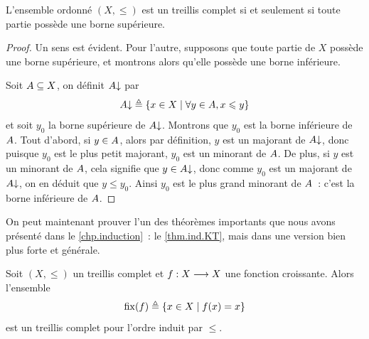 \begin{property}\label{prop.treillis.complet.justInf}
  L'ensemble ordonné $(X,\leq)$ est un treillis complet si et seulement si toute
  partie possède une borne supérieure.
\end{property}

\begin{proof}
  Un sens est évident. Pour l'autre, supposons que toute partie de $X$ possède
  une borne supérieure, et montrons alors qu'elle possède une borne inférieure.

  Soit $A\subseteq X$, on définit $A\mathbin{\downarrow}$ par
  \[A\mathbin{\downarrow} \triangleq \left\{ x\in X \;\middle\vert\; \forall y \in A, x \leqslant y \right\}\]
  et soit $y_0$ la borne supérieure de $A\mathbin{\downarrow}$. Montrons que $y_0$ est
  la borne inférieure de $A$. Tout d'abord, si $y\in A$, alors par
  définition, $y$ est un majorant de $A\mathbin{\downarrow}$, donc puisque $y_0$ est
  le plus petit majorant, $y_0$ est un minorant de $A$. De plus, si $y$ est
  un minorant de $A$, cela signifie que $y\in A\mathbin{\downarrow}$, donc comme
  $y_0$ est un majorant de $A\mathbin{\downarrow}$, on en déduit que $y\leq y_0$.
  Ainsi $y_0$ est le plus grand minorant de $A$~: c'est la borne inférieure
  de $A$.
\end{proof}

On peut maintenant prouver l'un des théorèmes importants que nous avons présenté
dans le \cref{chp.induction}~: le \cref{thm.ind.KT}, mais dans une version bien
plus forte et générale.

\begin{theorem}\label{thm.KT}
  Soit $(X,\leq)$ un treillis complet et $f : \displaystyle X \longrightarrow X$ une fonction
  croissante. Alors l'ensemble
  \[\operatorname{fix}(f) \triangleq \left\{ x\in X \;\middle\vert\; f(x) = x \right\}\]
  est un treillis complet pour l'ordre induit par $\leq$.
\end{theorem}

